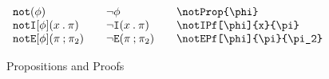 \documentclass[11pt]{article}
\begin{document}
\begin{figure}
\begin{small}
\begin{displaymath}
\begin{array}{l@{\qquad}l@{\qquad}l@{\qquad}l}
        \notProp{\phi}                                  & \notProp*{\phi}                  & \verb|\notProp{\phi}|                                  \\
        \notIPf[\phi]{x}{\pi}                           & \notIPf*{x}{\pi}                 & \verb|\notIPf[\phi]{x}{\pi}|                           \\
        \notEPf[\phi]{\pi}{\pi_2}                       & \notEPf*{\pi}{\pi_2}             & \verb|\notEPf[\phi]{\pi}{\pi_2}|
      \end{array}
    \end{displaymath}
  \end{small}

  \caption{Propositions and Proofs}
  \label{fig:prop}
\end{figure}

\restoregeometry
\end{document}

